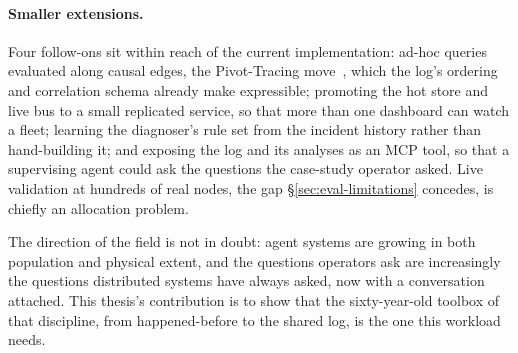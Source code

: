 \paragraph{Smaller extensions.} Four follow-ons sit within reach of the
current implementation: ad-hoc queries evaluated along causal edges, the
Pivot-Tracing move~\cite{mace2015pivot}, which the log's ordering and
correlation schema already make expressible; promoting the hot store and
live bus to a small replicated service, so that more than one dashboard can
watch a fleet; learning the diagnoser's rule set from the incident history
rather than hand-building it; and exposing the log and its analyses as an
MCP tool, so that a supervising agent could ask the questions the
case-study operator asked. Live validation at hundreds of real nodes, the
gap \S\ref{sec:eval-limitations} concedes, is chiefly an allocation problem.

\medskip

The direction of the field is not in doubt: agent systems are growing in
both population and physical extent, and the questions operators ask are
increasingly the questions distributed systems have always asked, now
with a conversation attached. This thesis's contribution is to show that
the sixty-year-old toolbox of that discipline, from happened-before to
the shared log, is the one this workload needs.
